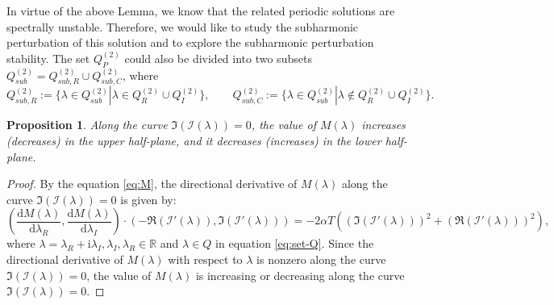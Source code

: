\documentclass[11pt,reqno]{amsart}
\newcommand{\ii}{\mathrm{i}}
\newcommand{\dd}{\mathrm{d}}
\newtheorem{prop}{Proposition}
\numberwithin{equation}{section}
\begin{document}
In virtue of the above Lemma, we know that the related periodic solutions are spectrally unstable.
Therefore, we would like to study the subharmonic perturbation of this solution and to explore the subharmonic perturbation stability.
The set $Q^{(2)}_P$ could also be divided into two subsets $Q^{(2)}_{sub}=Q^{(2)}_{sub,R}\cup Q^{(2)}_{sub,C}$, where 
\begin{equation}\label{eq:Q_Psub}
	Q^{(2)}_{sub,R}:=\{\lambda\in Q^{(2)}_{sub}|\lambda\in  Q^{(2)} _{R}\cup  Q^{(2)} _{I}\}, \qquad 
	Q^{(2)}_{sub,C}:=\{\lambda\in Q^{(2)}_{sub}|\lambda\notin  Q^{(2)} _R\cup  Q^{(2)} _{I}\}.
\end{equation}

\begin{prop}\label{prop:I-M-increase}
	Along the curve ${\Im}(\mathcal{I}(\lambda))=0$, the value of $M(\lambda)$ increases (decreases) in the upper half-plane, and it decreases (increases) in the lower half-plane.
\end{prop}

\begin{proof}
By the equation \eqref{eq:M}, the directional derivative of $M(\lambda)$ along the curve ${\Im}(\mathcal{I}(\lambda))=0$ is given by:
	\begin{equation}\label{eq:muz}
		\left( \frac{\dd  M(\lambda)}{\dd  \lambda_R},\frac{\dd  M(\lambda)}{\dd  \lambda_I} \right) \cdot \left(- {\Re} (\mathcal{I}'(\lambda)),{\Im}(\mathcal{I}'(\lambda)) \right) =-2\alpha T  \left( \left({\Im}(\mathcal{I}'(\lambda))\right)^2+\left({\Re}(\mathcal{I}'(\lambda)) \right)^2 \right),
	\end{equation}
	where $\lambda=\lambda_R+\ii \lambda_I, \lambda_I,\lambda_R\in \mathbb{R}$ and $\lambda\in Q$ in equation \eqref{eq:set-Q}. Since the directional derivative of $M(\lambda)$ with respect to $\lambda$ is nonzero along the curve ${\Im}(\mathcal{I}(\lambda))=0$, the value of $M(\lambda)$ is increasing or decreasing along the curve $\Im(\mathcal{I}(\lambda))=0$.
\end{proof}
\end{document}
